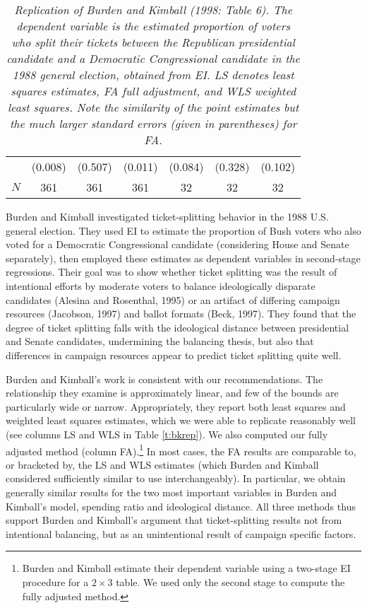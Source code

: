 \documentclass[11pt,titlepage]{article}
\begin{document}
\begin{table}[th]
\begin{center}
\begin{tabular}{lcccccc}
        &       (0.008) &       (0.507) &       (0.011) &       (0.084) &       (0.328) &       (0.102) \\
$N$     &       361     &       361     &       361     &       32      &       32      &       32      \\
\hline
\end{tabular}
\end{center}
\caption{\em Replication of Burden and Kimball (1998: Table 6).  
The dependent variable is the estimated proportion of 
voters who split their tickets between the Republican presidential 
candidate and a Democratic Congressional candidate in the 1988 general 
election, obtained from EI.  LS denotes least squares estimates, FA 
full adjustment, and WLS weighted least squares.  Note the similarity
of the point estimates but the much larger standard errors (given in 
parentheses) for FA.}
\end{table}

Burden and Kimball investigated ticket-splitting behavior in the 1988
U.S. general election.  They used EI to estimate the proportion of
Bush voters who also voted for a Democratic Congressional candidate
(considering House and Senate separately), then employed these
estimates as dependent variables in second-stage regressions.  Their
goal was to show whether ticket splitting was the result of
intentional efforts by moderate voters to balance ideologically
disparate candidates (Alesina and Rosenthal, 1995) or an artifact of
differing campaign resources (Jacobson, 1997) and ballot formats
(Beck, 1997).  They found that the degree of ticket splitting falls
with the ideological distance between presidential and Senate
candidates, undermining the balancing thesis, but also that
differences in campaign resources appear to predict ticket splitting
quite well.

Burden and Kimball's work is consistent with our recommendations.  The
relationship they examine is approximately linear, and few of the
bounds are particularly wide or narrow.  Appropriately, they report
both least squares and weighted least squares estimates, which we were
able to replicate reasonably well (see columns LS and WLS in Table
\ref{t:bkrep}).  We also computed our fully adjusted method (column
FA).\footnote{Burden and Kimball estimate their dependent variable
  using a two-stage EI procedure for a $2\times 3$ table.  We used
  only the second stage to compute the fully adjusted method.} In most
cases, the FA results are comparable to, or bracketed by, the LS and
WLS estimates (which Burden and Kimball considered sufficiently
similar to use interchangeably).  In particular, we obtain generally
similar results for the two most important variables in Burden and
Kimball's model, spending ratio and ideological distance.  All three
methods thus support Burden and Kimball's argument that
ticket-splitting results not from intentional balancing, but as an
unintentional result of campaign specific factors.
\end{document}
